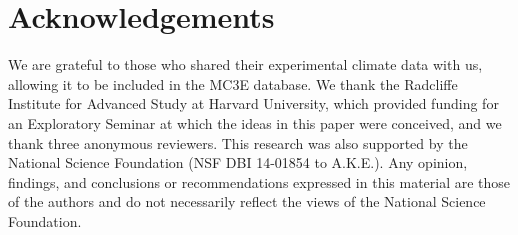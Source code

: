 \documentclass{article}
\begin{document}
 \section* {Acknowledgements}
We are grateful to those who shared their experimental climate data with us, allowing it to be included in the MC3E database. We thank the Radcliffe Institute for Advanced Study at Harvard University, which provided funding for an Exploratory Seminar at which the ideas in this paper were conceived, and we thank three anonymous reviewers. This research was also supported by the National Science Foundation (NSF DBI 14-01854 to A.K.E.). Any opinion, findings, and conclusions or recommendations expressed in this material are those of the authors and do not necessarily reflect the views of the National Science Foundation.
\clearpage

\end{document}

